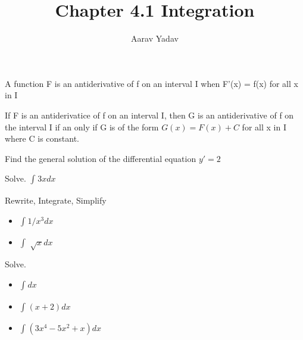 \documentclass{article}
\title{Chapter 4.1 Integration}
\author{Aarav Yadav}
\theoremstyle{mytheoremstyle}
\theoremstyle{mytheoremstyle}
\theoremstyle{myproblemstyle}
\begin{document}
    \maketitle

    \setcounter{section}{4}


    \begin{definition}
        A function F is an antiderivative of f on an interval I when F'(x) = f(x) for all x in I
    \end{definition}

    \begin{theorem}
        If F is an antiderivatice of f on an interval I, then G is an antiderivative of f on the
        interval I if an only if G is of the form $ G(x) = F(x) + C $ for all x in I where C is constant.
    \end{theorem}
    
    \begin{problem}
        Find the general solution of the differential equation $ y' = 2 $
    \end{problem}
    
    \begin{problem}
        Solve. $ \int_{}^{} 3x dx $ 
    \end{problem}

    \begin{problem}
        Rewrite, Integrate, Simplify
        \begin{itemize}
            \item $ \int_{}^{} 1/x^{3} dx $
            \item $ \int_{}^{} \sqrt[]{x} dx $
        \end{itemize} 
    \end{problem}
    
    \begin{problem}
        Solve.

        \begin{itemize}
            \item $ \int_{}^{} dx $
            \item $ \int_{}^{} (x+2) dx $
            \item $ \int_{}^{} (3x^4 - 5x^2 + x) dx $ 
        \end{itemize}
    \end{problem}
\end{document}
